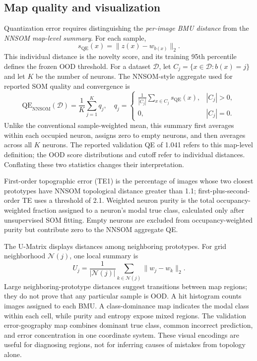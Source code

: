 \documentclass[11pt]{article}
\begin{document}
\subsection{Map quality and visualization}
Quantization error requires distinguishing the \emph{per-image BMU distance} from the \emph{NNSOM map-level summary}. For each sample,
\begin{equation}\label{eq:qesample}
 s_{\mathrm{QE}}(x)=\lVert z(x)-w_{b(x)}\rVert_2.
\end{equation}
This individual distance is the novelty score, and its training 95th percentile defines the frozen OOD threshold. For a dataset $\mathcal D$, let $C_j=\{x\in\mathcal D:b(x)=j\}$ and let $K$ be the number of neurons. The NNSOM-style aggregate used for reported SOM quality and convergence is
\begin{equation}\label{eq:qe}
 \mathrm{QE}_{\mathrm{NNSOM}}(\mathcal D)=\frac{1}{K}\sum_{j=1}^K q_j,\quad
 q_j=\begin{cases}
 \displaystyle\frac{1}{|C_j|}\sum_{x\in C_j}s_{\mathrm{QE}}(x),&|C_j|>0,\\
 0,&|C_j|=0.
 \end{cases}
\end{equation}
Unlike the conventional sample-weighted mean, this summary first averages within each occupied neuron, assigns zero to empty neurons, and then averages across all $K$ neurons. The reported validation QE of 1.041 refers to this map-level definition; the OOD score distributions and cutoff refer to individual distances. Conflating these two statistics changes their interpretation.

First-order topographic error (TE1) is the percentage of images whose two closest prototypes have NNSOM topological distance greater than 1.1; first-plus-second-order TE uses a threshold of 2.1. Weighted neuron purity is the total occupancy-weighted fraction assigned to a neuron's modal true class, calculated only after unsupervised SOM fitting. Empty neurons are excluded from occupancy-weighted purity but contribute zero to the NNSOM aggregate QE.

The U-Matrix displays distances among neighboring prototypes. For grid neighborhood $\mathcal N(j)$, one local summary is
\begin{equation}\label{eq:umatrix}
 U_j=\frac{1}{|\mathcal N(j)|}\sum_{k\in\mathcal N(j)}\lVert w_j-w_k\rVert_2.
\end{equation}
Large neighboring-prototype distances suggest transitions between map regions; they do not prove that any particular sample is OOD. A hit histogram counts images assigned to each BMU. A class-dominance map indicates the modal class within each cell, while purity and entropy expose mixed regions. The validation error-geography map combines dominant true class, common incorrect prediction, and error concentration in one coordinate system. These visual encodings are useful for diagnosing regions, not for inferring causes of mistakes from topology alone.
\end{document}
